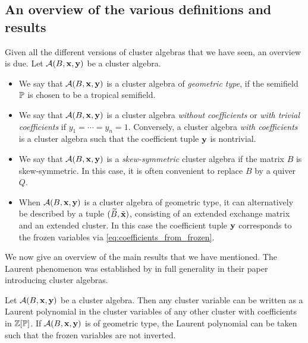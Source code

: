 \subsection{An overview of the various definitions and results}

Given all the different versions of cluster algebras that we have seen, an overview is
due. Let $\mathcal{A}(B, \mathbf{x}, \mathbf{y})$ be a cluster algebra.
\begin{itemize}
	\item We say that $\mathcal{A}(B, \mathbf{x}, \mathbf{y})$ is a cluster algebra of \emph{geometric
		      type}, if the semifield $\mathbb{P}$ is chosen to be
	      a tropical semifield.
	\item We say that $\mathcal{A}(B, \mathbf{x}, \mathbf{y})$ is a cluster algebra \emph{without
		      coefficients} or \emph{with trivial
		      coefficients} if $y_1 = \cdots = y_n =
		      1$. Conversely, a cluster algebra \emph{with coefficients} is a cluster algebra such that the coefficient tuple $\mathbf{y}$ is nontrivial.
	\item We say that $\mathcal{A}(B, \mathbf{x}, \mathbf{y})$ is a \emph{skew-symmetric} cluster
	      algebra if the matrix $B$ is skew-symmetric. In
	      this case, it is often convenient to replace $B$ by a quiver $Q$.
	\item When $\mathcal{A}(B, \mathbf{x}, \mathbf{y})$ is a cluster algebra of geometric type, it can alternatively
	      be described by a tuple $(\widetilde{B}, \tilde{\mathbf{x}})$, consisting of an extended exchange matrix and an
	      extended cluster. In this case the coefficient tuple $\mathbf{y}$ corresponds to the frozen
	      variables via \cref{eq:coefficients_from_frozen}.
\end{itemize}
%
We now give an overview of the main results that we have mentioned. The Laurent
phenomenon was established by \textcite{FominZelevinsky2002CAF} in full generality in
their paper introducing cluster algebras.
\begin{theorem}

	Let $\mathcal{A}(B, \mathbf{x}, \mathbf{y})$ be a cluster algebra. Then any cluster variable can be written
	as a Laurent polynomial in the cluster variables of any other cluster with coefficients
	in $\mathbb{Z}[\mathbb{P}]$. If $\mathcal{A}(B, \mathbf{x}, \mathbf{y})$ is of geometric type, the Laurent polynomial
	can be taken such that the frozen variables are not inverted.
\end{theorem}

